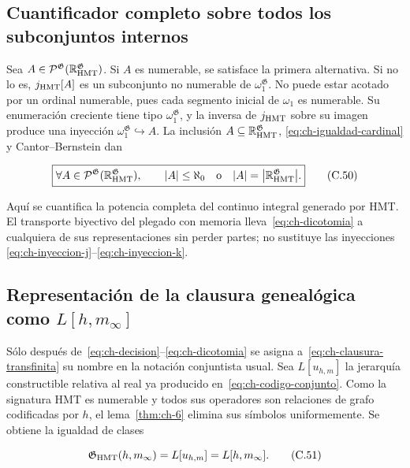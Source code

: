 \subsection{Cuantificador completo sobre todos los subconjuntos internos}

Sea
\(A\in\mathcal P^{\mathfrak G}
(\mathbb R_{\rm HMT}^{\mathfrak G})\). Si \(A\) es numerable, se satisface la
primera alternativa. Si no lo es, \(j_{\rm HMT}[A]\) es un subconjunto no
numerable de \(\omega_1^{\mathfrak G}\). No puede estar acotado por un ordinal
numerable, pues cada segmento inicial de \(\omega_1\) es numerable. Su
enumeración creciente tiene tipo \(\omega_1^{\mathfrak G}\), y la inversa de
\(j_{\rm HMT}\) sobre su imagen produce una inyección
\(\omega_1^{\mathfrak G}\hookrightarrow A\). La inclusión
\(A\subseteq\mathbb R_{\rm HMT}^{\mathfrak G}\), \eqref{eq:ch-igualdad-cardinal} y
Cantor--Bernstein dan

\[
 \boxed{
 \forall A\in\mathcal P^{\mathfrak G}
   (\mathbb R_{\rm HMT}^{\mathfrak G}),\qquad
 |A|\le\aleph_0
 \quad\text{o}\quad
 |A|=\bigl|\mathbb R_{\rm HMT}^{\mathfrak G}\bigr|.}
\tag{C.50}\label{eq:ch-dicotomia}
\]

Aquí se cuantifica la potencia completa del continuo integral generado por
HMT. El transporte biyectivo del plegado con memoria lleva~\eqref{eq:ch-dicotomia} a cualquiera
de sus representaciones sin perder partes; no sustituye las inyecciones
\eqref{eq:ch-inyeccion-j}--\eqref{eq:ch-inyeccion-k}.

\subsection{Representación de la clausura genealógica como \texorpdfstring{\(L[h,m_\infty]\)}{L[h,m-infinito]}}

Sólo después de~\eqref{eq:ch-decision}--\eqref{eq:ch-dicotomia} se asigna
a~\eqref{eq:ch-clausura-transfinita} su nombre en la notación
conjuntista usual. Sea \(L[u_{h,m}]\) la jerarquía constructible relativa al
real ya producido en~\eqref{eq:ch-codigo-conjunto}. Como la signatura HMT es numerable y todos sus
operadores son relaciones de grafo codificadas por \(h\), el lema~\ref{thm:ch-6} elimina
sus símbolos uniformemente. Se obtiene la igualdad de clases

\[
 \mathfrak G_{\rm HMT}(h,m_\infty)
 =L[u_{h,m}]=L[h,m_\infty].
\tag{C.51}\label{eq:ch-representacion-L}
\]

